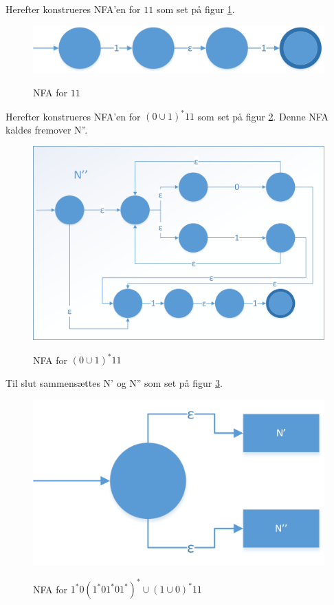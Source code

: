 \documentclass[a4paper,10pt,article]{memoir}
\begin{document}
Herefter konstrueres NFA'en for $11$ som set på figur \ref{fig:fig13}.

\begin{figure}[h]%
\centering
\includegraphics[width=\textwidth]{Fig13x.png}
\label{fig:fig13}
\caption{NFA for $11$}
\end{figure}

Herefter konstrueres NFA'en for $(0\cup1)^*11$ som set på figur \ref{fig:fig14}. Denne NFA kaldes fremover N''.

\begin{figure}[h]%
\centering
\includegraphics[width=\textwidth]{Fig14x.png}
\label{fig:fig14}
\caption{NFA for $(0\cup1)^*11$}
\end{figure}

Til slut sammensættes N' og N'' som set på figur \ref{fig:fig15}.

\begin{figure}[h]%
\centering
\includegraphics[width=\textwidth]{Fig15x.png}
\label{fig:fig15}
\caption{NFA for $1^*0(1^*01^*01^*)^*  \cup (1 \cup 0)^*11$}
\end{figure}
\end{document}
